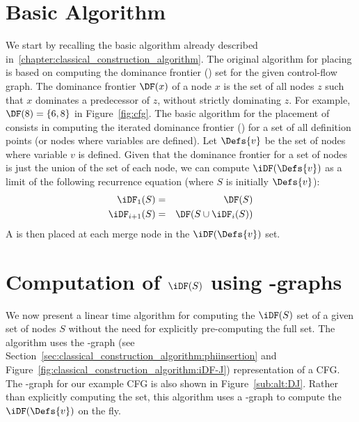 {\section{Basic Algorithm}
\label{section:alternative_ssa_construction_algorithms:cytron}
We start by recalling the basic algorithm already described in~\ref{chapter:classical_construction_algorithm}. 
The original algorithm for placing \phifuns is based on computing the dominance frontier (\DF) set for the given control-flow graph. 
The dominance frontier $\DF(x)$ of a node $x$ is the set of all nodes $z$ such that $x$ dominates a predecessor of $z$, without strictly dominating $z$. 
For example, $\DF(8)= \{ 6, 8 \}$ in Figure~\ref{fig:cfg}. 
The basic algorithm for the placement of \phifuns consists in computing the 
iterated dominance frontier (\iDF) for a set of all definition points (or nodes 
where variables are defined).  Let $\Defs{v}$ be the set of nodes where 
variable $v$ is defined.  Given that the dominance frontier for a set of nodes 
is just the union of the \DF set of each node, we can compute $\iDF(\Defs{v})$ 
as a limit of the following recurrence equation (where $S$ is initially 
$\Defs{v}$):
\begin{eqnarray*}
\iDF_1(S) &=& \DF(S) \\
\iDF_{i+1} (S) &=& \DF(S \cup \iDF_i(S)) 
\end{eqnarray*}
A \phifun is then placed at each merge node in the  $\iDF(\Defs{v})$ set. 

\section{Computation of $\iDF(S)$ using \DJ-graphs}
\label{section:alternative_ssa_construction_algorithms:sreedhar}
We now present a linear time algorithm for computing the $\iDF(S)$ set of
a given set of nodes $S$ without the need for explicitly pre-computing the full 
\DF set.  The algorithm uses the \DJ-graph (see 
Section~\ref{sec:classical_construction_algorithm:phiinsertion} and 
Figure~\ref{fig:classical_construction_algorithm:iDF-J}) representation of 
a CFG.  The \DJ-graph for our example CFG is also shown in 
Figure~\ref{sub:alt:DJ}.  Rather than explicitly computing the \DF set, this 
algorithm uses a \DJ-graph to compute the $\iDF(\Defs{v})$ on the fly. 

}
